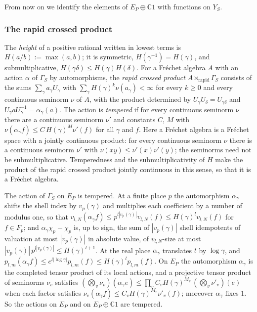 \documentclass[11pt]{amsart}
\theoremstyle{definition}
\theoremstyle{remark}
\newcommand{\C}{\mathbb C}
\begin{document}
From now on we identify the elements of $E_P\oplus\C1$ with functions on $Y_S$.

\subsubsection*{The rapid crossed product}
The \emph{height} of a positive rational written in lowest terms is
$H(a/b):=\max(a,b)$; it is symmetric, $H(\gamma^{-1})=H(\gamma)$, and
submultiplicative, $H(\gamma\delta)\le H(\gamma)H(\delta)$.  For a Fr\'echet
algebra $A$ with an action $\alpha$ of $\Gamma_S$ by automorphisms, the
\emph{rapid crossed product} $A\rtimes_{\mathrm{rapid}}\Gamma_S$ consists of the
sums $\sum_{\gamma}a_{\gamma}U_{\gamma}$ with
$\sum_{\gamma}H(\gamma)^{k}\nu(a_{\gamma})<\infty$ for every $k\ge0$ and every
continuous seminorm $\nu$ of $A$, with the product determined by
$U_{\gamma}U_{\delta}=U_{\gamma\delta}$ and
$U_{\gamma}aU_{\gamma}^{-1}=\alpha_{\gamma}(a)$.  The action is \emph{tempered}
if for every continuous seminorm $\nu$ there are a continuous seminorm $\nu'$
and constants $C$, $M$ with $\nu(\alpha_{\gamma}f)\le C\,H(\gamma)^{M}\nu'(f)$
for all $\gamma$ and $f$.  Here a Fr\'echet algebra is a Fr\'echet space
with a jointly continuous product: for every continuous seminorm $\nu$ there is
a continuous seminorm $\nu'$ with $\nu(xy)\le\nu'(x)\nu'(y)$; the seminorms need
not be submultiplicative.  Temperedness and the submultiplicativity of $H$
make the product of the rapid crossed product jointly continuous in this sense,
so that it is a Fr\'echet algebra.

The action of $\Gamma_S$ on $E_P$ is tempered.  At a finite place $p$ the
automorphism $\alpha_{\gamma}$ shifts the shell index by $v_p(\gamma)$ and
multiplies each coefficient by a number of modulus one, so that
$v_{l,N}(\alpha_{\gamma}f)\le p^{l|v_p(\gamma)|}v_{l,N}(f)\le
H(\gamma)^{l}v_{l,N}(f)$ for $f\in F_p$; and $\alpha_{\gamma}\chi_p-\chi_p$ is,
up to sign, the sum of $|v_p(\gamma)|$ shell idempotents of valuation at most
$|v_p(\gamma)|$ in absolute value, of $v_{l,N}$-size at most
$|v_p(\gamma)|\,p^{l|v_p(\gamma)|}\le H(\gamma)^{l+1}$.  At the real place
$\alpha_{\gamma}$ translates $t$ by $\log\gamma$, and
$p_{l,m}(\alpha_{\gamma}f)\le e^{l|\log\gamma|}p_{l,m}(f)\le
H(\gamma)^{l}p_{l,m}(f)$.  On $E_P$ the automorphism $\alpha_{\gamma}$ is the
completed tensor product of its local actions, and a projective tensor
product of seminorms $\nu_v$ satisfies
$(\bigotimes_v\nu_v)(\alpha_{\gamma}e)\le\prod_vC_vH(\gamma)^{M_v}\,
(\bigotimes_v\nu'_v)(e)$ when each factor satisfies
$\nu_v(\alpha_{\gamma}f)\le C_vH(\gamma)^{M_v}\nu'_v(f)$; moreover
$\alpha_{\gamma}$ fixes $1$.  So the actions on $E_P$ and on $E_P\oplus\C1$
are tempered.
\end{document}
